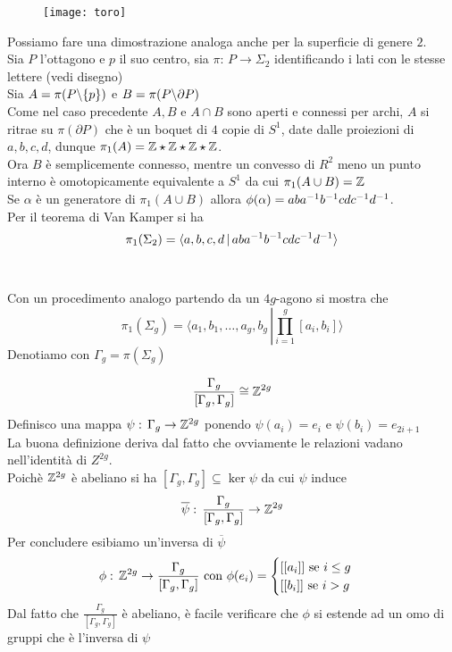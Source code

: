 \begin{figure}[!h]
\centering
\texttt{[image: toro]}

\end{figure}
\newpage
Possiamo fare una dimostrazione analoga anche per la superficie di genere $2$.\\
Sia $P$ l'ottagono e $p$ il suo centro, sia $\pi:\, P \to \Sigma_2$ identificando i lati con le stesse lettere (vedi disegno)\\
Sia $A=\pi(P\backslash \{p\})$ e $B=\pi(P\backslash \partial P)$\\
Come nel caso precedente $A,B$ e $A\cap B$ sono aperti e connessi per archi, $A$ si ritrae su $\pi(\partial P)$ che \`e un boquet di $4$ copie di $S^1$, date dalle proiezioni di $a,b,c,d$, dunque $\pi_1(A)=\mathbb{Z}\star \mathbb{Z}\star \mathbb{Z}\star \mathbb{Z}$.\\
Ora $B$ \`e semplicemente connesso, mentre un convesso di $R^2$ meno un punto interno \`e omotopicamente equivalente a $S^1$ da cui $\pi_1(A\cup B)=\mathbb{Z}$\\
Se $\alpha$ \`e un generatore di $\pi_1(A\cup B) $ allora $\phi(\alpha)= aba^{-1}b^{-1} c d c^{-1} d^{-1} $.\\
Per il teorema di Van Kamper si ha 
$$ \pi_1(\Sigma_2)=\langle a,b,c,d \, \vert \, aba^{-1}b^{-1} c d c^{-1} d^{-1} \rangle$$\\
\\
Con un procedimento analogo partendo da un $4g$-agono si mostra che 
$$\pi_1(\Sigma_g) =\langle a_1, b_1, \dots, a_g, b_g \, \left\vert \prod_{i=1}^g [ a_i,b_i] \right. \rangle$$
Denotiamo con $\Gamma_g = \pi ( \Sigma_g)$
\begin{thm}
$$\frac{\Gamma_g}{[\Gamma_g,\Gamma_g]} \cong \mathbb{Z}^{2g}$$
\proof Definisco una mappa $\psi :\, \Gamma_g \to \mathbb{Z}^{2g}$ ponendo $\psi(a_i)=e_i$ e $\psi(b_i)=e_{2i+1}$\\
La buona definizione deriva dal fatto che ovviamente le relazioni vadano nell'identit\`a di $Z^{2g}$.\\
Poich\`e $\mathbb{Z}^{2g}$ \`e abeliano si ha $[\Gamma_g,\Gamma_g]\subseteq \ker \psi$ da cui $\psi $ induce 
$$ \overline{\psi}:\, \frac{\Gamma_g}{[\Gamma_g, \Gamma_g]} \to \mathbb{Z}^{2g}$$
Per concludere esibiamo un'inversa di $\overline{\psi}$
$$ \phi :\, \mathbb{Z}^{2g} \to  \frac{\Gamma_g}{[\Gamma_g, \Gamma_g]}  \text{ con } \phi(e_i)=\begin{cases}[[a_i]] \text{ se } i\leq g\\
[[b_i]]\text{ se } i>g \end{cases}$$
Dal fatto che $\frac{\Gamma_g}{[\Gamma_g,\Gamma_g]}$ \`e abeliano, \`e facile verificare che $\phi$ si estende ad un omo di gruppi che \`e l'inversa di $\psi$
\end{thm}

